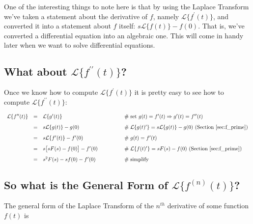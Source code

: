 \documentclass{article}
\theoremstyle{definition}
\begin{document}
\bigskip
\noindent
One of the interesting things to note here is that by using the Laplace Transform we've taken a statement about the derivative of $f$, namely $\mathcal{L}\{f^\prime(t)\}$,
and converted it into a statement about $f$ itself: $s \mathcal{L}\{f(t)\} - f(0)$. That is, we've converted a differential equation into an algebraic one. This will come in handy later 
when we want to solve differential equations.

\newpage
\subsection{What about $\mathcal{L}\{f^{\prime\prime}(t)\}$?}
\label{eqn:f_double_prime}

\bigskip
\noindent
Once we know how to compute $\mathcal{L}\{f^{\prime}(t)\}$ it is pretty easy to see how to compute $\mathcal{L}\{f^{\prime\prime}(t)\}$:

\begin{equation*}
\begin{array}{lllll}
\mathcal{L}\{f^{\prime \prime}(t)\}           
&=&  \mathcal{L}\{g^\prime (t)\}                                 &\qquad \qquad \mathrel{\#} \text{set $g(t) = f^\prime(t) \Rightarrow g^\prime(t) = f^{\prime \prime}(t)$}                         \\   
[8pt]
&=& s \mathcal{L}\{g(t)\}  - g(0)                                 &\qquad  \qquad \mathrel{\#} \mathcal{L}\{g(t)^\prime\} = s \mathcal{L}\{g(t)\}  - g(0) \text{ (Section \ref{sec:f_prime})}   \\   
[8pt]
&=& s \mathcal{L}\{f^\prime(t)\} - f^\prime(0)             &\qquad \qquad \mathrel{\#} g(t) = f^\prime(t)                                                                                                                   \\
[8pt] 
&=& s \big [ sF(s) - f(0) \big ] - f^\prime(0)                 &\qquad \qquad \mathrel{\#} \mathcal{L}\{f(t)^\prime\} = s F(s) -f(0) \text{ (Section \ref{sec:f_prime})}                             \\  
[8pt]
&=& s^2F(s) - sf(0) - f^\prime(0)                                &\qquad \qquad \mathrel{\#} \text{simplify}
\end{array}
\end{equation*}

\smallskip
\subsection{So what is the General Form of $\mathcal{L}\{f^{(n)}(t)\}$?}
\bigskip
\noindent
The general form of the Laplace Transform of the $n^{th}$ derivative of some function $f(t)$ is 
\end{document}

